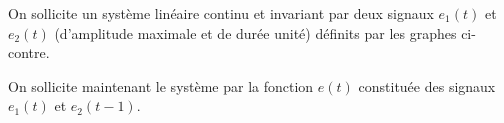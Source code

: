 On sollicite un système linéaire continu et invariant par deux signaux $e_1(t)$ 
et $e_2(t)$ (d'amplitude maximale et de durée unité) définits 
par les graphes ci-contre.

\begin{marginfigure}
    \centering
    
\end{marginfigure}
\begin{marginfigure}
    \centering
    
\end{marginfigure}
On sollicite maintenant le système par la fonction $e(t)$ constituée 
des signaux $e_1(t)$ et $e_2(t-1)$. 

